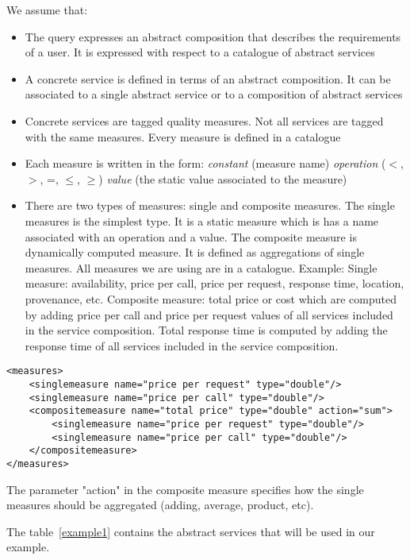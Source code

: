 \documentclass{sig-alternate}
\begin{document}
We assume that: 
\begin{itemize}
\item The query expresses an abstract composition that describes the requirements of a user. It is expressed with respect to a catalogue of abstract services
\item A concrete service is defined in terms of an abstract composition. It can be associated to a single abstract service or to a composition of abstract services
\item Concrete services are tagged quality measures. Not all services are tagged with the same measures. Every measure is defined in a catalogue
\item Each measure is written in the form: \textit{constant} (measure name) \textit{operation} ($<$, $>$, =, $\leq$, $\geq$) \textit{value} (the static value associated to the measure)
\item There are two types of measures: single and composite measures. The single measures is the simplest type. It is a static measure which is has a name associated with an operation and a value. The composite measure is dynamically computed measure. It is defined as aggregations of single measures. All measures we are using are in a catalogue. Example:
Single measure: availability, price per call, price per request, response time, location, provenance, etc.
Composite measure: total price or cost which are computed by adding price per call and price per request values of all services included in the service composition. Total response time is computed by adding the response time of all services included in the service composition.
\end{itemize}

\begin{tiny}
\begin{verbatim}
<measures>
	<singlemeasure name="price per request" type="double"/>
	<singlemeasure name="price per call" type="double"/>
	<compositemeasure name="total price" type="double" action="sum">
		<singlemeasure name="price per request" type="double"/>
		<singlemeasure name="price per call" type="double"/>
	</compositemeasure>
</measures>
\end{verbatim}
\end{tiny}

The parameter "action" in the composite measure specifies how the single measures should be aggregated (adding, average, product, etc).

The table~\ref{example1} contains the abstract services that will be used in our example.
\end{document}
